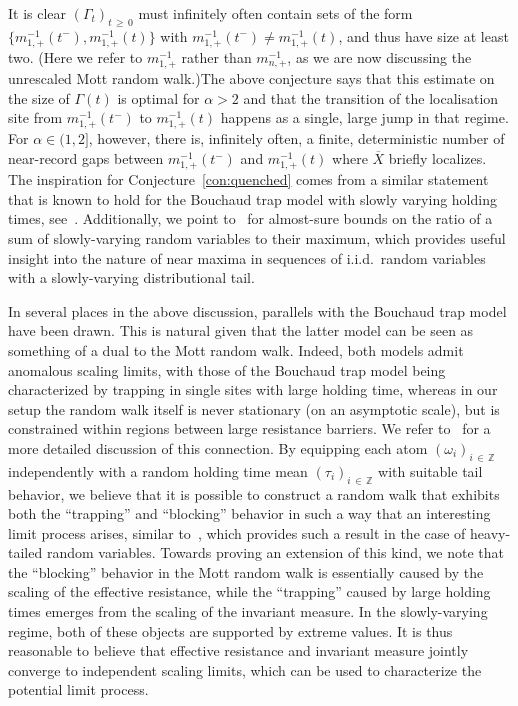 \documentclass[AHL,Unicode,longabstracts,published]{cedram}
\newcommand{\Z}{\mathbb Z}
\begin{document}
\noindent It is clear $(\Gamma_t)_{t\,\geq\,0}$ must infinitely often contain sets of the form $\{ m_{1,+}^{-1}(t^-), m_{1,+}^{-1}(t)\}$ with $m_{1,+}^{-1}(t^-)\neq m_{1,+}^{-1}(t)$, and thus have size at least two. (Here we refer to $m_{1,+}^{-1}$ rather than $m_{n,+}^{-1}$, as we are now discussing the unrescaled Mott random walk.)\linebreak The above conjecture says that this estimate on the size of $\Gamma(t)$ is optimal for $\alpha> 2$ and that the transition of the localisation site from $m_{1,+}^{-1}(t^-)$ to $m_{1,+}^{-1}(t)$ happens as a single, large jump in that regime. For $\alpha\in(1,2]$, however, there is, infinitely often, a finite, deterministic number of near-record gaps between $m_{1,+}^{-1}(t^-)$ and $m_{1,+}^{-1}(t)$ where $\overline X$ briefly localizes. The inspiration for Conjecture~\ref{con:quenched} comes from a similar statement that is known to hold for the Bouchaud trap model with slowly varying holding times, see~\cite{CM2,M15}. Additionally, we point to~\cite[Theorem~1.5]{CM2} for almost-sure bounds on the ratio of a sum of slowly-varying random variables to their maximum, which provides useful insight into the nature of near maxima in sequences of i.i.d.\ random variables with a slowly-varying distributional tail.

In several places in the above discussion, parallels with the Bouchaud trap model have been drawn. This is natural given that the latter model can be seen as something of a dual to the Mott random walk. Indeed, both models admit anomalous scaling limits, with those of the Bouchaud trap model being characterized by trapping in single sites with large holding time, whereas in our setup the random walk itself is never stationary (on an asymptotic scale), but is constrained within regions between large resistance barriers. We refer to~\cite[Section~1.5]{CFJ} for a more detailed discussion of this connection. By equipping each atom $(\omega_i)_{i\,\in\,\Z}$ independently with a random holding time mean $(\tau_i)_{i\,\in\,\Z}$ with suitable tail behavior, we believe that it is possible to construct a random walk that exhibits both the ``trapping'' and ``blocking'' behavior in such a way that an interesting limit process arises, similar to~\cite[Theorem~1.8]{CFJ}, which provides such a result in the case of heavy-tailed random variables. Towards proving an extension of this kind, we note that the ``blocking'' behavior in the Mott random walk is essentially caused by the scaling of the effective resistance, while the ``trapping'' caused by large holding times emerges from the scaling of the invariant measure. In the slowly-varying regime, both of these objects are supported by extreme values. It is thus reasonable to believe that effective resistance and invariant measure jointly converge to independent scaling limits, which can be used to characterize the potential limit process.
\end{document}
